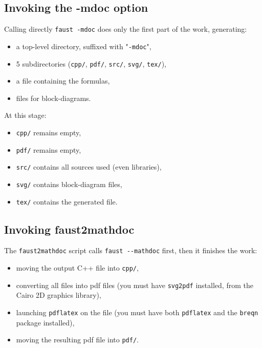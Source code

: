 \documentclass[a4paper]{book}
\begin{document}
\subsection{Invoking the -mdoc option}
\label{sec:invoking-mdoc}

Calling directly \lstinline!faust -mdoc! does only the first part of the work, generating:
\begin{itemize}
\item a top-level directory, suffixed with "\texttt{-mdoc}",
\item 5 subdirectories (\lstinline!cpp/!, \lstinline!pdf/!, \lstinline!src/!, \lstinline!svg/!, \lstinline!tex/!),
\item a \latex file containing the formulas,
\item \svg files for block-diagrams.
\end{itemize}

At this stage:
\begin{itemize}
\item \lstinline!cpp/! remains empty,
\item \lstinline!pdf/! remains empty,
\item \lstinline!src/! contains all \faust sources used (even libraries),
\item \lstinline!svg/! contains \svg block-diagram files,
\item \lstinline!tex/! contains the generated \latex file.
\end{itemize}

\subsection{Invoking faust2mathdoc}
\label{sec:invok-faust2m}

The \lstinline!faust2mathdoc! script calls \lstinline!faust --mathdoc! first, then it finishes the work:
\begin{itemize}
\item moving the output C++ file into \lstinline!cpp/!,
\item converting all \svg files into pdf files (you must have \lstinline!svg2pdf! installed, from the Cairo 2D graphics library),
\item launching \lstinline!pdflatex! on the \latex file (you must have both \lstinline!pdflatex! and the \lstinline!breqn! package installed),
\item moving the resulting pdf file into \lstinline!pdf/!.
\end{itemize}
\end{document}
